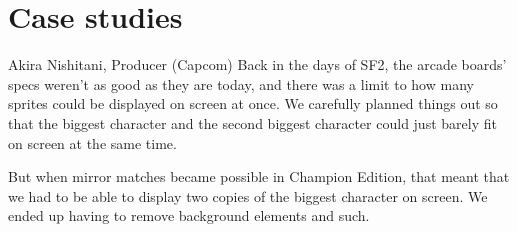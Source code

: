 \chapter{Case studies}
\begin{q}{Akira Nishitani, Producer (Capcom)}
Back in the days of SF2, the arcade boards' specs weren't as good as they are today, and there was a limit to how many sprites could be displayed on screen at once. We carefully planned things out so that the biggest character and the second biggest character could just barely fit on screen at the same time. 

But when mirror matches became possible in Champion Edition, that meant that we had to be able to display two copies of the biggest character on screen. We ended up having to remove background elements and such.
\end{q}